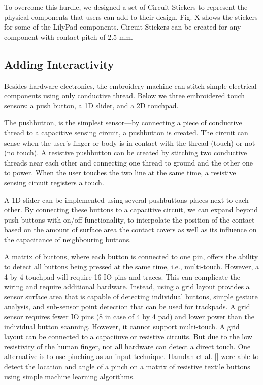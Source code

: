 \documentclass[header.tex]{subfiles}
\begin{document}
To overcome this hurdle, we designed a set of Circuit Stickers to represent the physical components that users can add to their design. Fig. X shows the stickers for some of the LilyPad components. Circuit Stickers can be created for any component with contact pitch of 2.5 mm. 



\subsection{Adding Interactivity}
Besides hardware electronics, the embroidery machine can stitch simple electrical components using only conductive thread. Below we three embroidered touch sensors: a push button, a 1D slider, and a 2D touchpad.

The pushbutton, is the simplest sensor---by connecting a piece of conductive thread to a capacitive sensing circuit, a pushbutton is created. The circuit can sense when the user's finger or body is in contact with the thread (touch) or not (no touch). A resistive pushbutton can be created by stitching two conductive threads near each other and connecting one thread to ground and the other one to power. When the user touches the two line at the same time, a resistive sensing circuit registers a touch.

A 1D slider can be implemented using several pushbuttons places next to each other. By connecting these buttons to a capacitive circuit, we can expand beyond push buttons with on/off functionality, to interpolate the position of the contact based on the amount of surface area the contact covers as well as its influence on the capacitance of neighbouring buttons.


A matrix of buttons, where each button is connected to one pin, offers the ability to detect all buttons being pressed at the same time, i.e., multi-touch. However, a 4 by 4 touchpad will require 16 IO pins and traces. This can complicate the wiring and require additional hardware. Instead, using a grid layout provides a sensor surface area that is capable of detecting individual buttons, simple gesture analysis, and sub-sensor point detection that can be used for trackpads. A grid sensor requires fewer IO pins (8 in case of 4 by 4 pad) and lower power than the individual button scanning. However, it cannot support multi-touch. A grid layout can be connected to a capaciiuve or resistive circuits. But due to the low resistivity of the human finger, not all hardware can detect a direct touch. One alternative is to use pinching as an input technique. Hamdan et al. [] were able to detect the location and angle of a pinch on a matrix of resistive textile buttons using simple machine learning algorithms.
\end{document}
